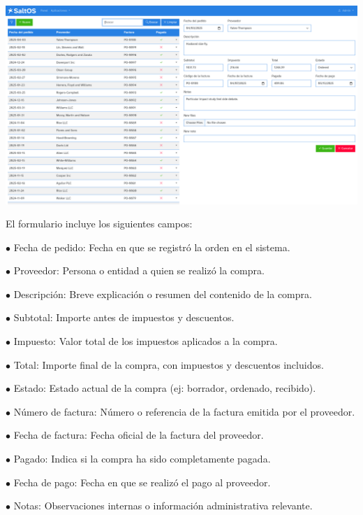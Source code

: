 \documentclass[a4paper]{article}
\begin{document}
\begin{center}\includegraphics[width=1\textwidth]{../ujest/snaps/test-screenshots-js-screenshots-purchases-purchase-edit-100-es-es-1-snap.png}\end{center}

El formulario incluye los siguientes campos:

\begin{compactitem}
\item[\color{myblue}$\bullet$] Fecha de pedido: Fecha en que se registró la orden en el sistema.
\item[\color{myblue}$\bullet$] Proveedor: Persona o entidad a quien se realizó la compra.
\item[\color{myblue}$\bullet$] Descripción: Breve explicación o resumen del contenido de la compra.
\item[\color{myblue}$\bullet$] Subtotal: Importe antes de impuestos y descuentos.
\item[\color{myblue}$\bullet$] Impuesto: Valor total de los impuestos aplicados a la compra.
\item[\color{myblue}$\bullet$] Total: Importe final de la compra, con impuestos y descuentos incluidos.
\item[\color{myblue}$\bullet$] Estado: Estado actual de la compra (ej: borrador, ordenado, recibido).
\item[\color{myblue}$\bullet$] Número de factura: Número o referencia de la factura emitida por el proveedor.
\item[\color{myblue}$\bullet$] Fecha de factura: Fecha oficial de la factura del proveedor.
\item[\color{myblue}$\bullet$] Pagado: Indica si la compra ha sido completamente pagada.
\item[\color{myblue}$\bullet$] Fecha de pago: Fecha en que se realizó el pago al proveedor.
\item[\color{myblue}$\bullet$] Notas: Observaciones internas o información administrativa relevante.
\end{compactitem}
\end{document}
